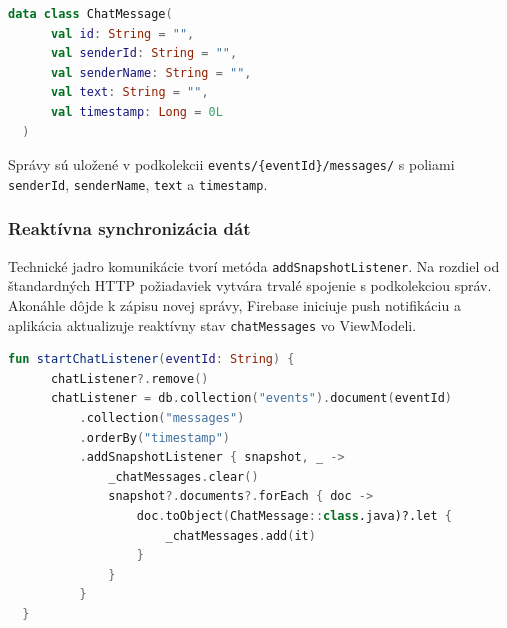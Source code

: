   \begin{lstlisting}[language=Kotlin, caption={Dátový model správy v jazyku Kotlin}]
  data class ChatMessage(
      val id: String = "",
      val senderId: String = "",
      val senderName: String = "",
      val text: String = "",
      val timestamp: Long = 0L
  )
  \end{lstlisting}
  \fi                                                                                                                                                                                                                              

  Správy sú uložené v podkolekcii \texttt{events/\{eventId\}/messages/}
  s poliami \texttt{senderId}, \texttt{senderName}, \texttt{text}
  a \texttt{timestamp}.

  \subsubsection{Reaktívna synchronizácia dát}
  Technické jadro komunikácie tvorí metóda \texttt{addSnapshotListener}.
  Na rozdiel od štandardných HTTP požiadaviek vytvára trvalé spojenie
  s podkolekciou správ. Akonáhle dôjde k zápisu novej správy, Firebase
  iniciuje push notifikáciu a aplikácia aktualizuje reaktívny stav
  \texttt{chatMessages} vo ViewModeli.

  \begin{lstlisting}[language=Kotlin, caption={Implementácia real-time listenera vo ViewModeli}]
  fun startChatListener(eventId: String) {
      chatListener?.remove()
      chatListener = db.collection("events").document(eventId)
          .collection("messages")
          .orderBy("timestamp")
          .addSnapshotListener { snapshot, _ ->
              _chatMessages.clear()
              snapshot?.documents?.forEach { doc ->
                  doc.toObject(ChatMessage::class.java)?.let {
                      _chatMessages.add(it)
                  }
              }
          }
  }
  \end{lstlisting}